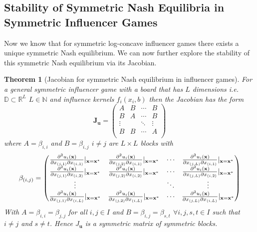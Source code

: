\documentclass{article}
\newtheorem{theorem}{Theorem}[section]
\newcommand {\N}{\mathbb{N}}
\newcommand {\D}{\mathbb{D}}
\begin{document}
        \subsection{Stability of Symmetric Nash Equilibria in Symmetric Influencer Games}
            Now we know that for symmetric log-concave influencer games there exists a unique symmetric Nash equilibrium. We can now further explore the stability of this symmetric Nash equilibrium via its Jacobian. 
            \begin{theorem}[Jacobian for symmetric Nash equilibrium in influencer games]\label{thm:SI_Jacobian}
                For a general symmetric influencer game with a board that has $L$ dimensions i.e. $\D\subset \mathbb{R}^{L}$ $L\in \N$ and influence kernels $f_i(x_i,b)$ then the Jacobian has the form
                \begin{equation}\label{eq:paper_jacobian_general}
                    \mathbf{J}_{\mathbf{u}}=\begin{pmatrix}
                        A & B& \cdots & B \\ %
                        B & A & \cdots & B \\ %
                        \vdots &  & \ddots &\vdots  \\ %
                        B& B & \cdots & A \\ %
                        \end{pmatrix}
                \end{equation}
            where $A=\beta_{i,i}$ and $B=\beta_{i,j}$ $i\neq j$ are $L\times L$ blocks with 
            \begin{align}
                \beta_{(i,j)}=\begin{pmatrix}
                    \pdv[2]{u_i(\mathbf{x})}{x_{(j,1)}}{x_{(i,1)}}|_{\mathbf{x}=\mathbf{x}^*} & \pdv[2]{u_i(\mathbf{x})}{x_{(j,2)}}{x_{(i,1)}}|_{\mathbf{x}=\mathbf{x}^*}& \cdots &\pdv[2]{u_i(\mathbf{x})}{x_{(j,L)}}{x_{(i,1)}}|_{\mathbf{x}=\mathbf{x}^*} \\ %
                    \pdv[2]{u_i(\mathbf{x})}{x_{(j,1)}}{x_{(i,2)}}|_{\mathbf{x}=\mathbf{x}^*} & \pdv[2]{u_i(\mathbf{x})}{x_{(j,2)}}{x_{(i,2)}}|_{\mathbf{x}=\mathbf{x}^*}& \cdots &\pdv[2]{u_i(\mathbf{x})}{x_{(j,L)}}{x_{(i,2)}}|_{\mathbf{x}=\mathbf{x}^*} \\ %
                    \vdots & \quad & \ddots  & \vdots \\ %
                    \pdv[2]{u_i(\mathbf{x})}{x_{(j,1)}}{x_{(i,L)}}|_{\mathbf{x}=\mathbf{x}^*} & \pdv[2]{u_i(\mathbf{x})}{x_{(j,2)}}{x_{(i,L)}}|_{\mathbf{x}=\mathbf{x}^*}& \cdots &\pdv[2]{u_i(\mathbf{x})}{x_{(j,L)}}{x_{(i,L)}}|_{\mathbf{x}=\mathbf{x}^*}
                \end{pmatrix}
            \end{align}
            With $A=\beta_{i,i}= \beta_{j,j}$ for all $i,j\in I$ and $B=\beta_{i,j}= \beta_{s,t}$ $\forall i,j,s,t\in I$ such that $i\neq j$ and $s\neq t$. Hence $J_\mathbf{u}$ is a symmetric matrix of symmetric blocks.  
            \end{theorem}
\end{document}
